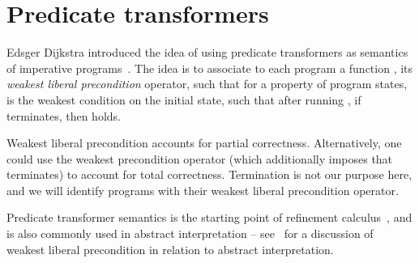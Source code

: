 \documentclass[]{llncs}
\begin{document}
  \section{Predicate transformers}
\par
Edsger Dijkstra introduced the idea of using predicate transformers as semantics of imperative programs~\cite{Dijkstra1978}. The idea is to associate to each program  a function , its \emph{weakest liberal precondition} operator, such that for a property  of program states,  is the weakest condition on the initial state, such that after running , if  terminates, then  holds.
\par
Weakest liberal precondition accounts for partial correctness. Alternatively, one could use the weakest precondition operator (which additionally imposes that  terminates) to account for total correctness. Termination is not our purpose here, and we will identify programs with their weakest liberal precondition operator.
\par
Predicate transformer semantics is the starting point of refinement calculus~\cite{Back1998}, and is also commonly used in abstract interpretation -- see~\cite{Cousot1997a} for a discussion of weakest liberal precondition in relation to abstract interpretation.
\par
\end{document}

